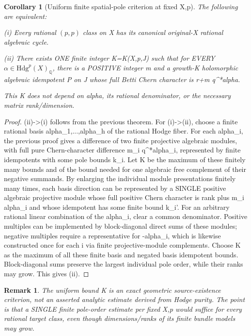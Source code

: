 \documentclass[11pt]{article}
\newtheorem{corollary}[theorem]{Corollary}
\newtheorem{remark}[theorem]{Remark}
\begin{document}
\begin{corollary}[Uniform finite spatial-pole criterion at fixed X,p]
The following are equivalent:

(i) Every rational $(p,p)$ class on X
has its canonical original-X rational
algebraic cycle.

(ii) There exists ONE finite integer
K=K(X,p,J) such that for EVERY
$\alpha\in\mathrm{Hdg}^p(X)_{\mathbb Q}$,
there is a POSITIVE integer m and
a growth-K holomorphic algebraic
idempotent P on J whose full Betti
Chern character is r+m q^*alpha.

This K does not depend on alpha, its
rational denominator, or the necessary
matrix rank/dimension.
\end{corollary}
\begin{proof}
(ii)->(i) follows from the previous theorem.
For (i)->(ii), choose a finite rational
basis alpha_1,...,alpha_h of the rational
Hodge fiber. For each alpha_i,
the previous proof gives a difference
of two finite projective algebraic modules,
with full pure Chern-character difference
m_i q^*alpha_i, represented by finite
idempotents with some pole bounds k_i.
Let K be the maximum of these finitely
many bounds and of the bound needed for
one algebraic free complement of their
negative summands. By enlarging the
individual module presentations finitely
many times, each basis direction can be
represented by a SINGLE positive
algebraic projective module whose
full positive Chern character is rank
plus m_i alpha_i and whose idempotent
has some finite bound k_i'.
For an arbitrary rational linear combination
of the alpha_i, clear a common denominator.
Positive multiples can be implemented
by block-diagonal direct sums of these
modules; negative multiples require a
representative for -alpha_i, which is
likewise constructed once for each i
via finite projective-module
complements. Choose K as the maximum
of all these finite basis and negated
basis idempotent bounds. Block-diagonal
sums preserve the largest individual
pole order, while their ranks may grow.
This gives (ii).
\end{proof}
\begin{remark}
The uniform bound K is an exact
\emph{geometric source-existence
criterion}, not an asserted analytic
estimate derived from Hodge purity.
The point is that a SINGLE finite
pole-order estimate per fixed X,p
would suffice for every rational target
class, even though dimensions/ranks
of its finite bundle models may grow.
\end{remark}
\end{document}
